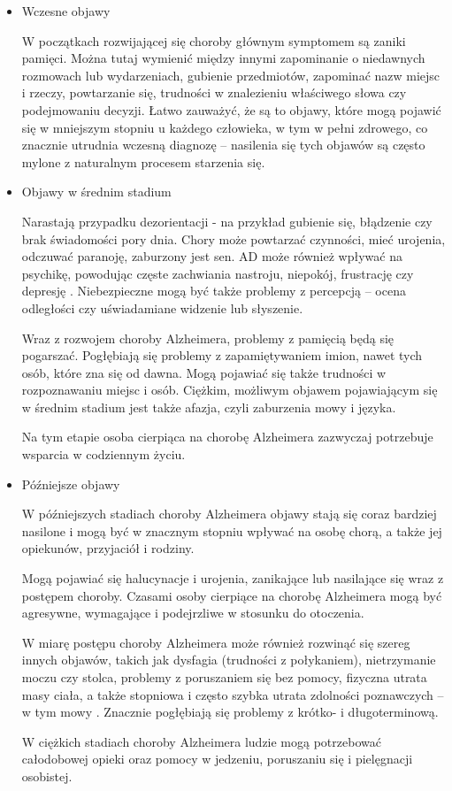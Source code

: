\begin{itemize}

  \item Wczesne objawy

        W początkach rozwijającej się choroby głównym symptomem są zaniki pamięci.
        Można tutaj wymienić między innymi zapominanie o niedawnych rozmowach lub wydarzeniach, gubienie przedmiotów, zapominać nazw miejsc i rzeczy, powtarzanie się, trudności w znalezieniu właściwego słowa czy podejmowaniu decyzji.
        Łatwo zauważyć, że są to objawy, które mogą pojawić się w mniejszym stopniu u każdego człowieka, w tym w pełni zdrowego, co znacznie utrudnia wczesną diagnozę -- nasilenia się tych objawów są często mylone z naturalnym procesem starzenia się.

  \item Objawy w średnim stadium

        Narastają przypadku dezorientacji - na przykład gubienie się, błądzenie czy brak świadomości pory dnia.
        Chory może powtarzać czynności, mieć urojenia, odczuwać paranoję, zaburzony jest sen.
        AD może również wpływać na psychikę, powodując częste zachwiania nastroju, niepokój, frustrację czy depresję \cite{li2014behavioral}.
        Niebezpieczne mogą być także problemy z percepcją -- ocena odległości czy uświadamiane widzenie lub słyszenie.

        Wraz z rozwojem choroby Alzheimera, problemy z pamięcią będą się pogarszać.
        Pogłębiają się problemy z zapamiętywaniem imion, nawet tych osób, które zna się od dawna.
        Mogą pojawiać się także trudności w rozpoznawaniu miejsc i osób.
        Ciężkim, możliwym objawem pojawiającym się w średnim stadium jest także afazja, czyli zaburzenia mowy i języka.

        Na tym etapie osoba cierpiąca na chorobę Alzheimera zazwyczaj potrzebuje wsparcia w codziennym życiu.

  \item Późniejsze objawy

        W późniejszych stadiach choroby Alzheimera objawy stają się coraz bardziej nasilone i mogą być w znacznym stopniu wpływać na osobę chorą, a także jej opiekunów, przyjaciół i rodziny.

        Mogą pojawiać się halucynacje i urojenia, zanikające lub nasilające się wraz z postępem choroby.
        Czasami osoby cierpiące na chorobę Alzheimera mogą być agresywne, wymagające i podejrzliwe w stosunku do otoczenia.

        W miarę postępu choroby Alzheimera może również rozwinąć się szereg innych objawów, takich jak dysfagia (trudności z połykaniem), nietrzymanie moczu czy stolca, problemy z poruszaniem się bez pomocy, fizyczna utrata masy ciała, a także stopniowa i często szybka utrata zdolności poznawczych -- w tym mowy \cite{joe2019cognitive}.
        Znacznie pogłębiają się problemy z krótko- i długoterminową.

        W ciężkich stadiach choroby Alzheimera ludzie mogą potrzebować całodobowej opieki oraz pomocy w jedzeniu, poruszaniu się i pielęgnacji osobistej.

\end{itemize}

